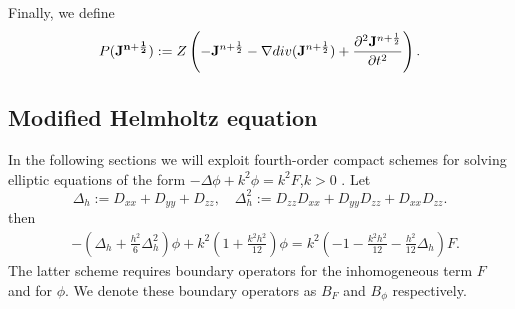 \documentclass[12pt,reqno]{amsart}
\newtheorem{proposition}[theorem]{Proposition}
\theoremstyle{definition}
\numberwithin{equation}{section}
\begin{document}


	
	Finally, we define 
	$$
	P({\bf J^{n+\frac{1}{2}}}):=Z\left ( -{\bf J}^{n+\frac{1}{2}}-\nabla div({\bf J}^{n+\frac{1}{2}})+\frac{\partial^2{\bf J}^{n+\frac{1}{2}}}{\partial t^2}\right ).
	$$
   \subsection{Modified Helmholtz equation}
   In the following sections we will exploit fourth-order compact schemes for solving elliptic equations of the form $-\Delta \phi+k^2\phi=k^2F$,$k>0$ \cite{singer_turkel}.
Let 
$$
\Delta_h:=D_{xx}+D_{yy}+D_{zz}, \quad \Delta^2_h:= D_{zz}D_{xx}+D_{yy}D_{zz}+D_{xx}D_{zz}.
$$
then 
\begin{align*}
	&
	-\left (
	\Delta_h+\frac{h^2}{6}\Delta^2_h
	\right)\phi+
	k^2\left (
	1+\frac{k^2h^2}{12}
	\right)\phi=
	k^2\left (
	-1-\frac{k^2h^2}{12}
	-\frac{h^2}{12}\Delta_h
	\right)F.
\end{align*}
The latter scheme requires boundary operators for the inhomogeneous term $F$ and for $\phi$. We denote these boundary operators as 
$B_{F}$ and $B_{\phi}$ respectively.

   
\end{document}
